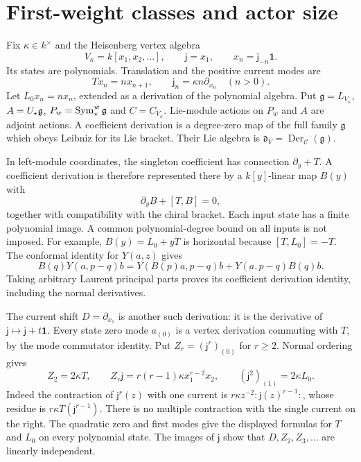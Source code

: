 \section{First-weight classes and actor size}
\label{sec:vol2-first-weight}

Fix $\kappa\in k^\times$ and the Heisenberg vertex algebra
\[
 V_\kappa=k[x_1,x_2,\ldots],\qquad
 \mathsf j=x_1,\qquad x_n=\mathsf j_{-n}\mathbf1.
\]
Its states are polynomials. Translation and the positive current
modes are
\[
 Tx_n=nx_{n+1},\qquad
 \mathsf j_n=\kappa n\partial_{x_n}\quad(n>0).
\]
Let $L_0x_n=nx_n$, extended as a derivation of the polynomial
algebra. Put $\mathfrak g=L_{V_\kappa}$, $A=U_{\star}\mathfrak g$,
$P_w=\operatorname{Sym}_{\star}^w\mathfrak g$ and $C=C_{V_\kappa}$. Lie-module
actions on $P_w$ and $A$ are adjoint actions. A coefficient
derivation is a degree-zero map of the full family $\mathfrak g$
which obeys Leibniz for its Lie bracket. Their Lie algebra is
$\mathfrak d_V=\operatorname{Der}_{\mathscr C}(\mathfrak g)$.

In left-module coordinates, the singleton coefficient has
connection $\partial_y+T$. A coefficient derivation is therefore
represented there by a $k[y]$-linear map $B(y)$ with
\begin{equation}\label{eq:vol2-horizontal-derivation}
 \partial_yB+[T,B]=0,
\end{equation}
together with compatibility with the chiral bracket. Each input
state has a finite polynomial image. A common polynomial-degree
bound on all inputs is not imposed. For example,
$B(y)=L_0+yT$ is horizontal because $[T,L_0]=-T$. The conformal
identity for $Y(a,z)$ gives
\[
 B(q)Y(a,p-q)b
   =Y(B(p)a,p-q)b+Y(a,p-q)B(q)b.
\]
Taking arbitrary Laurent principal parts proves its coefficient
derivation identity, including the normal derivatives.

The current shift $D=\partial_{x_1}$ is another such derivation:
it is the derivative of $\mathsf j\mapsto\mathsf j+t\mathbf1$.
Every state zero mode $a_{(0)}$ is a vertex derivation commuting
with $T$, by the mode commutator identity. Put
$Z_r=(\mathsf j^r)_{(0)}$ for $r\geq2$. Normal ordering gives
\begin{equation}\label{eq:vol2-Heisenberg-derivations}
 Z_2=2\kappa T,\qquad
 Z_r\mathsf j=r(r-1)\kappa x_1^{r-2}x_2,
 \qquad (\mathsf j^2)_{(1)}=2\kappa L_0.
\end{equation}
Indeed the contraction of $\mathsf j^r(z)$ with one current is
$r\kappa z^{-2}{:}\mathsf j(z)^{r-1}{:}$, whose residue is
$r\kappa T(\mathsf j^{r-1})$. There is no multiple contraction
with the single current on the right. The quadratic zero and
first modes give the displayed formulas for $T$ and $L_0$ on
every polynomial state. The images of $\mathsf j$ show that
$D,Z_2,Z_3,\ldots$ are linearly independent.


